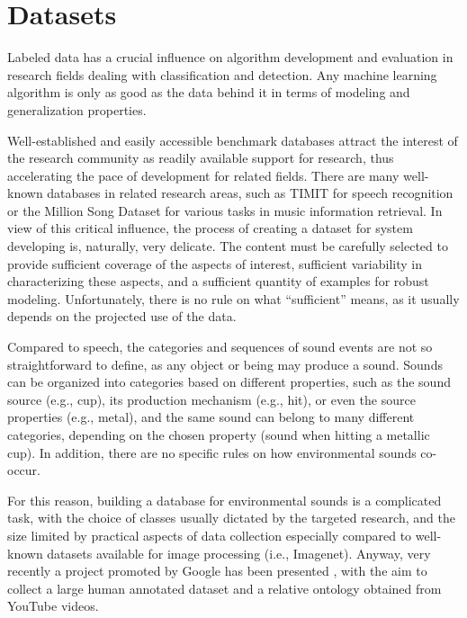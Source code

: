 \section{Datasets}

Labeled data has a crucial influence on algorithm development and evaluation in
research fields dealing with classification and detection. Any machine learning algorithm is only as good as the data behind it in terms of modeling and generalization
properties.

Well-established and easily accessible benchmark databases attract the interest of the research community as readily available support for research, thus accelerating the pace of development for related fields. There are many well-known databases in related research areas, such as TIMIT \cite{garofolo1993darpa} for speech
recognition or the Million Song Dataset \cite{bertin2011million} for various tasks in music information retrieval. In view of this critical influence, the process of creating
a dataset for system developing is, naturally, very delicate. The content must be carefully selected to provide sufficient coverage of the aspects of interest, sufficient variability in characterizing these aspects, and a sufficient quantity of examples for robust modeling. Unfortunately, there is no rule on what ``sufficient'' means, as it usually depends on the projected use of the data.


Compared to speech, the categories and sequences of sound events are not so straightforward to define, as any object or being may produce a sound. Sounds can be organized into categories based on different properties, such as the sound source (e.g., cup), its production mechanism (e.g., hit), or even the source properties (e.g., metal), and the same sound can belong to many different categories, depending on the chosen property (sound when hitting a metallic cup). In addition, there are no specific rules on how environmental sounds co-occur. 

For this reason, building a database for environmental sounds
is a complicated task, with the choice of classes usually dictated by the targeted
research, and the size limited by practical aspects of data collection especially compared to well-known datasets available for image processing (i.e., Imagenet\cite{deng2009imagenet}). Anyway, very recently a project promoted by Google has been presented \cite{gemmeke2017audio}, with the aim to collect a large human annotated dataset and a relative ontology obtained from YouTube videos.


